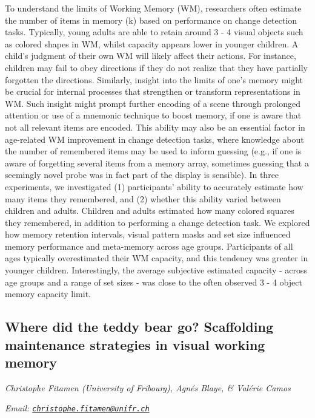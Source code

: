\documentclass[
  12pt,
]{book}
\begin{document}
To understand the limits of Working Memory (WM), researchers often estimate the number of items in memory (k) based on performance on change detection tasks. Typically, young adults are able to retain around 3 - 4 visual objects such as colored shapes in WM, whilst capacity appears lower in younger children. A child's judgment of their own WM will likely affect their actions. For instance, children may fail to obey directions if they do not realize that they have partially forgotten the directions. Similarly, insight into the limits of one's memory might be crucial for internal processes that strengthen or transform representations in WM. Such insight might prompt further encoding of a scene through prolonged attention or use of a mnemonic technique to boost memory, if one is aware that not all relevant items are encoded. This ability may also be an essential factor in age-related WM improvement in change detection tasks, where knowledge about the number of remembered items may be used to inform guessing (e.g., if one is aware of forgetting several items from a memory array, sometimes guessing that a seemingly novel probe was in fact part of the display is sensible). In three experiments, we investigated (1) participants' ability to accurately estimate how many items they remembered, and (2) whether this ability varied between children and adults. Children and adults estimated how many colored squares they remembered, in addition to performing a change detection task. We explored how memory retention intervals, visual pattern masks and set size influenced memory performance and meta-memory across age groups. Participants of all ages typically overestimated their WM capacity, and this tendency was greater in younger children. Interestingly, the average subjective estimated capacity - across age groups and a range of set sizes - was close to the often observed 3 - 4 object memory capacity limit.

\hypertarget{where-did-the-teddy-bear-go-scaffolding-maintenance-strategies-in-visual-working-memory}{%
\subsection{Where did the teddy bear go? Scaffolding maintenance strategies in visual working memory}\label{where-did-the-teddy-bear-go-scaffolding-maintenance-strategies-in-visual-working-memory}}

\emph{Christophe Fitamen (University of Fribourg), Agnés Blaye, \& Valérie Camos}

\emph{Email: \href{mailto:christophe.fitamen@unifr.ch}{\nolinkurl{christophe.fitamen@unifr.ch}}}
\end{document}
